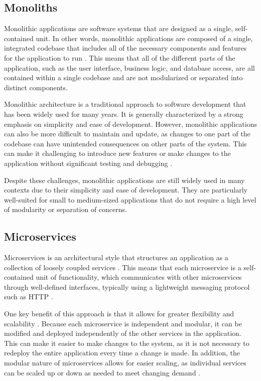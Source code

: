 \documentclass[conference]{IEEEtran}
\begin{document}
\subsection{Monoliths}

Monolithic applications are software systems that are designed as a single,
self-contained unit. In other words, monolithic applications are composed of a
single, integrated codebase that includes all of the necessary components and
features for the application to run \cite{kazanavivcius2019migrating}. This
means that all of the different parts of the application, such as the user
interface, business logic, and database access, are all contained within a
single codebase and are not modularized or separated into distinct components.

Monolithic architecture is a traditional approach to software development that
has been widely used for many years. It is generally characterized by a strong
emphasis on simplicity and ease of development. However, monolithic
applications can also be more difficult to maintain and update, as changes to
one part of the codebase can have unintended consequences on other parts of the
system. This can make it challenging to introduce new features or make changes
to the application without significant testing and debugging
\cite{kazanavivcius2019migrating}.

Despite these challenges, monolithic applications are still widely used in many
contexts due to their simplicity and ease of development. They are particularly
well-suited for small to medium-sized applications that do not require a high
level of modularity or separation of concerns.

\subsection{Microservices}

Microservices is an architectural style that structures an application as a
collection of loosely coupled services \cite{newman2021building}. This means
that each microservice is a self-contained unit of functionality, which
communicates with other microservices through well-defined interfaces,
typically using a lightweight messaging protocol such as HTTP
\cite{fowler-microservices}.

One key benefit of this approach is that it allows for greater flexibility and
scalability \cite{newman2019monolith}. Because each microservice is independent
and modular, it can be modified and deployed independently of the other
services in the application. This can make it easier to make changes to the
system, as it is not necessary to redeploy the entire application every time a
change is made. In addition, the modular nature of microservices allows for
easier scaling, as individual services can be scaled up or down as needed to
meet changing demand
\cite{newman2019monolith}\cite{newman2021building}\cite{fowler-microservices}.
\end{document}

